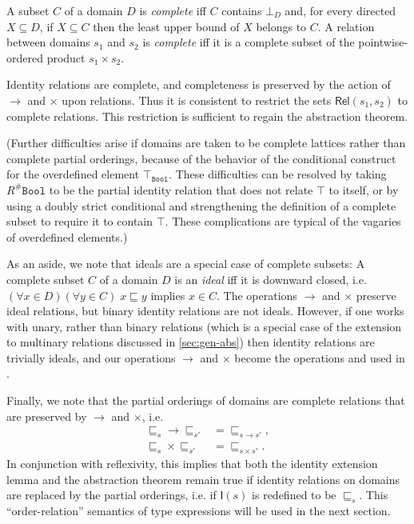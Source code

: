 \documentclass[sigplan,screen,nonacm,balance=false]{acmart}
\makeatletter
\theoremstyle{plain}
\newcommand{\ie}{i.e.\@\xspace}
\newcommand{\Bool}{\mathtt{Bool}}
\newcommand{\Rel}{\mathsf{Rel}}
\newcommand{\Id}{\mathsf{I}}
\makeatother
\begin{document}
A subset $C$ of a domain $D$ is \emph{complete} iff $C$ contains $\bot_{D}$ and, for every directed $X \subseteq D$, if $X \subseteq C$ then the least upper bound of $X$ belongs to $C$.
A relation between domains $s_1$ and $s_2$ is \emph{complete} iff it is a complete subset of the pointwise-ordered product $s_1 \times s_2$.

Identity relations are complete, and completeness is preserved by the action of $\to$ and $\times$ upon relations.
Thus it is consistent to restrict the sets $\Rel(s_1, s_2)$ to complete relations.
This restriction is sufficient to regain the abstraction theorem.

(Further difficulties arise if domains are taken to be complete lattices rather than complete partial orderings, because of the behavior of the conditional construct for the overdefined element $\top_{\Bool}$.
These difficulties can be resolved by taking $R^\# \Bool$ to be the partial identity relation that does not relate $\top$ to itself, or by using a doubly strict conditional and strengthening the definition of a complete subset to require it to contain $\top$.
These complications are typical of the vagaries of overdefined elements.)

As an aside, we note that ideals are a special case of complete subsets:
A complete subset $C$ of a domain $D$ is an \emph{ideal} iff it is downward closed, \ie $(\forall x \in D) (\forall y \in C) \; x \sqsubseteq y$ implies $x \in C$.
The operations $\to$ and $\times$ preserve ideal relations, but binary identity relations are not ideals.
However, if one works with unary, rather than binary relations (which is a special case of the extension to multinary relations discussed in \cref{sec:gen-abs}) then identity relations are trivially ideals, and our operations $\to$ and $\times$ become the operations \fbox{$\to$} and \fbox{$\times$} used in \citep{applicative}.

Finally, we note that the partial orderings of domains are complete relations that are preserved by $\to$ and $\times$, \ie
%
\begin{align*}
  {} \sqsubseteq_s {} \to {} \sqsubseteq_{s'} {} &= {} \sqsubseteq_{s \to s'} {}, \\
  {} \sqsubseteq_s {} \times {} \sqsubseteq_{s'} {} &= {} \sqsubseteq_{s \times s'} {}.
\end{align*}
%
In conjunction with reflexivity, this implies that both the identity extension lemma and the abstraction theorem remain true if identity relations on domains are replaced by the partial orderings, \ie if $\Id(s)$ is redefined to be $\sqsubseteq_s$.
This ``order-relation'' semantics of type expressions will be used in the next section.
\end{document}
